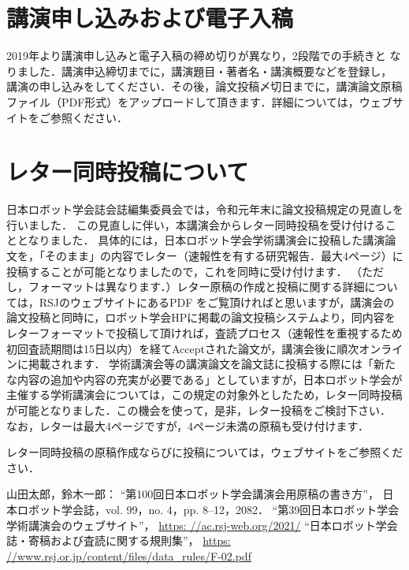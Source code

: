 \documentclass[a4paper]{jarticle}  %
\begin{document}
\section{講演申し込みおよび電子入稿}
2019年より講演申し込みと電子入稿の締め切りが異なり，2段階での手続きと
なりました．講演申込締切までに，講演題目・著者名・講演概要などを登録し，
講演の申し込みをしてください．その後，論文投稿〆切日までに，講演論文原稿ファイル（PDF形式）をアップロードして頂きます．詳細については，ウェブサイトをご参照ください．

\section{レター同時投稿について}

日本ロボット学会誌会誌編集委員会では，令和元年末に論文投稿規定の見直しを行いました．
この見直しに伴い，本講演会からレター同時投稿を受け付けることとなりました．
具体的には，日本ロボット学会学術講演会に投稿した講演論文を，「そのまま」の内容でレター（速報性を有する研究報告．最大4ページ）に投稿することが可能となりましたので，これを同時に受け付けます．
（ただし，フォーマットは異なります．）レター原稿の作成と投稿に関する詳細については，RSJのウェブサイトにあるPDF\cite{rsj_rules}
をご覧頂ければと思いますが，講演会の論文投稿と同時に，ロボット学会HPに掲載の論文投稿システムより，同内容をレターフォーマットで投稿して頂ければ，査読プロセス（速報性を重視するため初回査読期間は15日以内）を経てAcceptされた論文が，講演会後に順次オンラインに掲載されます．
学術講演会等の講演論文を論文誌に投稿する際には「新たな内容の追加や内容の充実が必要である」としていますが，日本ロボット学会が主催する学術講演会については，この規定の対象外としたため，レター同時投稿が可能となりました．この機会を使って，是非，レター投稿をご検討下さい． なお，レターは最大4ページですが，4ページ未満の原稿も受け付けます．

レター同時投稿の原稿作成ならびに投稿については，ウェブサイト\cite{website}をご参照ください．


\small
\begin{thebibliography}{9}

      山田太郎，鈴木一郎：
      ``第100回日本ロボット学会講演会用原稿の書き方''，
      日本ロボット学会誌，vol. 99，no. 4，pp. 8--12，2082．
      ``第39回日本ロボット学会学術講演会のウェブサイト''，
      \url{https: //ac.rsj-web.org/2021/}
      ``日本ロボット学会誌・寄稿および査読に関する規則集''，
      \url{https: //www.rsj.or.jp/content/files/data_rules/F-02.pdf}

\end{thebibliography}
\normalsize
\end{document}
